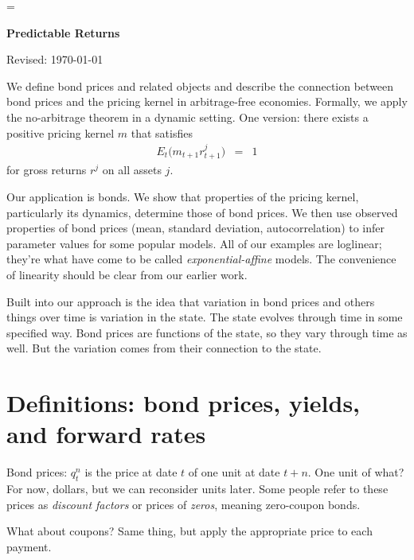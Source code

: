 \documentclass[11pt]{article}
\begin{document}
\parskip=\bigskipamount
\parindent=0.0in
\thispagestyle{empty}


\bigskip\bigskip
\centerline{\Large \bf Predictable Returns}
\centerline{Revised: \today}

\bigskip
We define bond prices and related objects
and describe the connection between bond prices and the
pricing kernel in arbitrage-free economies.
Formally, we apply the no-arbitrage theorem in a dynamic setting.
One version:  there exists a positive pricing kernel $m$ that satisfies
\begin{eqnarray}
    E_t \big( m_{t+1} r_{t+1}^j \big) &=& 1
    \label{eq:E(mr)=1}
\end{eqnarray}
for gross returns $r^j$ on all assets $j$.

Our application is bonds.
We show that properties of the pricing kernel,
particularly its dynamics,
determine those of bond prices.
We then use observed properties of bond prices
(mean, standard deviation, autocorrelation)
to infer parameter values for some popular models.
All of our examples are loglinear; they're what have come to be
called {\it exponential-affine\/} models.
The convenience of linearity should be clear from our earlier work.

Built into our approach is the idea that variation in
bond prices and others things over time
is variation in the state.
The state evolves through time in some specified way.
Bond prices are functions of the state,
so they vary through time as well.
But the variation comes from their connection to the state.


\section{Definitions:  bond prices, yields, and forward rates}

Bond prices:
$q^n_t$ is the price at date $t$ of one unit
at date $t+n$.
One unit of what?
For now, dollars, but we can reconsider units later.
Some people refer to these prices as {\it discount factors\/}
or prices of {\it zeros\/}, meaning zero-coupon bonds.

What about coupons?  Same thing, but apply the appropriate price
to each payment.
\end{document}

